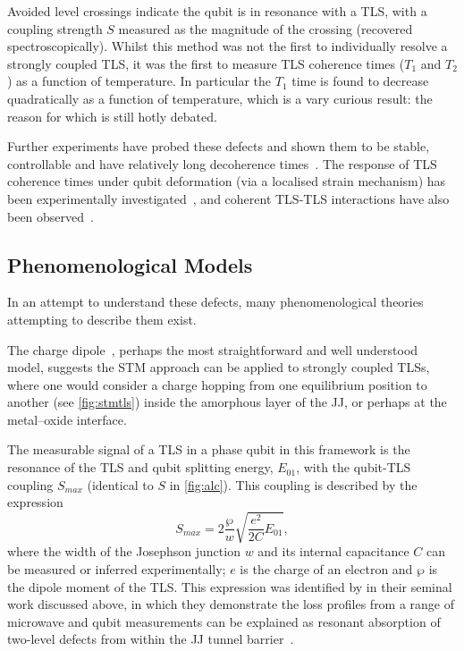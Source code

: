Avoided level crossings indicate the qubit is in resonance with a TLS, with a coupling strength $S$ measured as the magnitude of the crossing (recovered spectroscopically).
Whilst this method was not the first to individually resolve a strongly coupled TLS, it was the first to measure TLS coherence times ($T_1$ and $T_2$) as a function of temperature.
In particular the $T_1$ time is found to decrease quadratically as a function of temperature, which is a vary curious result: the reason for which is still hotly debated.

Further experiments have probed these defects and shown them to be stable, controllable and have relatively long decoherence times~\cite{Simmonds2004, Neeley2008, Shalibo2010, Lupascu2009, Gunnarsson2013}.
The response of TLS coherence times under qubit deformation (via a localised strain mechanism) has been experimentally investigated~\cite{Grabovskij2012}, and coherent TLS-TLS interactions have also been observed~\cite{Lisenfeld2015}.

\subsection{Phenomenological Models}\label{sec:phenom}

In an attempt to understand these defects, many phenomenological theories attempting to describe them exist.

The charge dipole~\cite{Martinis2005}, perhaps the most straightforward and well understood model, suggests the STM approach can be applied to strongly coupled TLSs, where one would consider a charge hopping from one equilibrium position to another (see \cref{fig:stmtls}) inside the amorphous layer of the JJ, or perhaps at the metal--oxide interface.

The measurable signal of a TLS in a phase qubit in this framework is the resonance of the TLS and qubit splitting energy, $E_{01}$, with the qubit-TLS coupling $S_{max}$ (identical to $S$ in \cref{fig:alc}).
This coupling is described by the expression~\cite{Martinis2005}
\begin{equation}
    S_{max}=2\frac{\wp}{w}\sqrt{\frac{e^2}{2C}E_{01}},
\label{eq:smax}
\end{equation}
where the width of the Josephson junction $w$ and its internal capacitance $C$ can be measured or inferred experimentally; $e$ is the charge of an electron and $\wp$ is the dipole moment of the TLS.
This expression was identified by \citeauthor{Martinis2005} in their seminal work discussed above, in which they demonstrate the loss profiles from a range of microwave and qubit measurements can be explained as resonant absorption of two-level defects from within the JJ tunnel barrier~\cite{Martinis2005}.

